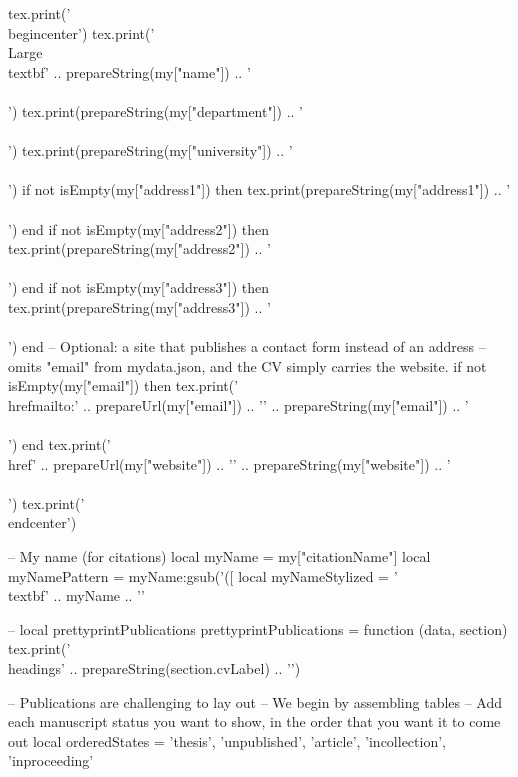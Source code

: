 \documentclass[letterpaper, 10pt]{article}
\newcommand{\headings}[1]{\section*{#1} \hrule \vspace{10pt}}
\begin{document}
\begin{luacode}
	tex.print('\\begin{center}')
	tex.print('{\\Large \\textbf{' .. prepareString(my["name"]) .. '}}\\\\')
	tex.print(prepareString(my["department"]) .. '\\\\')
	tex.print(prepareString(my["university"]) .. '\\\\')
	if not isEmpty(my["address1"]) then
		tex.print(prepareString(my["address1"]) .. '\\\\')
	end
	if not isEmpty(my["address2"]) then
		tex.print(prepareString(my["address2"]) .. '\\\\')
	end
	if not isEmpty(my["address3"]) then
		tex.print(prepareString(my["address3"]) .. '\\\\')
	end
	-- Optional: a site that publishes a contact form instead of an address
	-- omits "email" from mydata.json, and the CV simply carries the website.
	if not isEmpty(my["email"]) then
		tex.print('\\href{mailto:' .. prepareUrl(my["email"]) .. '}{' .. prepareString(my["email"]) .. '} \\\\')
	end
	tex.print('\\href{' .. prepareUrl(my["website"]) .. '}{' .. prepareString(my["website"]) .. '} \\\\')
	tex.print('\\end{center}')

	-- My name (for citations)
	local myName = my["citationName"]
	local myNamePattern = myName:gsub('([%
	local myNameStylized = '\\textbf{' .. myName .. '}'


	-- local prettyprintPublications
	prettyprintPublications = function (data, section)
		tex.print('\\headings{' .. prepareString(section.cvLabel) .. '}')

		-- Publications are challenging to lay out
		-- We begin by assembling tables
		-- Add each manuscript status you want to show, in the order that you want it to come out
		local orderedStates = {'thesis', 'unpublished', 'article', 'incollection', 'inproceeding'}


\end{luacode}
\end{document}
